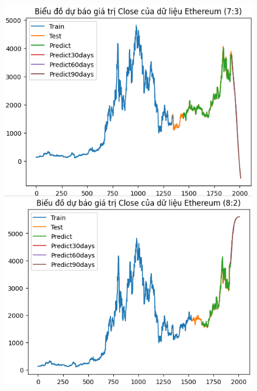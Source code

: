 \documentclass[conference]{IEEEtran}
\begin{document}
\begin{figure}[H]
    \centering
    \begin{minipage}{0.15\textwidth}
    \centering
    \includegraphics[width=1\textwidth]{Figure/RNN_ETH73.png}
    \end{minipage}
    \hfill
    \begin{minipage}{0.15\textwidth}
    \centering
    \includegraphics[width=1\textwidth]{Figure/RNN_ETH82.png}
    \end{minipage}
    \hfill
    \begin{minipage}{0.15\textwidth}
    \centering

\end{minipage}
\end{figure}
\end{document}
